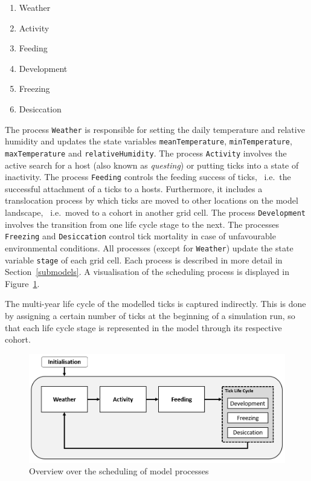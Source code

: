 \documentclass[a4paper, 11pt]{scrartcl}
\newcommand{\inlinecode}[1]{\texttt{\small #1}}
\begin{document}
\begin{enumerate}[noitemsep]
	\item Weather
	\item Activity
	\item Feeding
	\item Development
	\item Freezing
	\item Desiccation
\end{enumerate}

The process \inlinecode{Weather} is responsible for setting the daily temperature and relative humidity and updates the state variables \inlinecode{meanTemperature}, \inlinecode{minTemperature}, \inlinecode{maxTemperature} and \inlinecode{relativeHumidity}. The process \inlinecode{Activity} involves the active search for a host (also known as \textit{questing}) or putting ticks into a state of inactivity. The process \inlinecode{Feeding} controls the feeding success of ticks, ~i.e.\ the successful attachment of a ticks to a hosts. Furthermore, it includes a translocation process by which ticks are moved to other locations on the model landscape, ~i.e.\ moved to a cohort in another grid cell. The process \inlinecode{Development} involves the transition from one life cycle stage to the next. The processes \inlinecode{Freezing} and \inlinecode{Desiccation} control tick mortality in case of unfavourable environmental conditions. All processes (except for \inlinecode{Weather}) update the state variable \inlinecode{stage} of each grid cell. Each process is described in more detail in Section~\ref{submodels}. A visualisation of the scheduling process is displayed in Figure~\ref{fig:iris_scheduling}.

The multi-year life cycle of the modelled ticks is captured indirectly. This is done by assigning a certain number of ticks at the beginning of a simulation run, so that each life cycle stage is represented in the model through its respective cohort.

\begin{figure}[h!]
\centering
\includegraphics[width=0.8\linewidth]{scheduling}
\caption{Overview over the scheduling of model processes}
\label{fig:iris_scheduling}
\end{figure}
\end{document}
